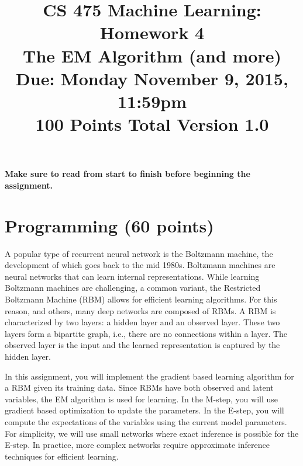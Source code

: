 \documentclass[11pt]{article}
\title{CS 475 Machine Learning: Homework 4\\The EM Algorithm (and more)\\
\Large{Due: Monday November 9, 2015, 11:59pm}\\
100 Points Total \hspace{1cm} Version 1.0}
\author{}
\date{}
\begin{document}
\large
\maketitle
\thispagestyle{headings}

\vspace{-.5in}

{\bf Make sure to read from start to finish before beginning the assignment.}


\section{Programming (60 points)}
A popular type of recurrent neural network is the Boltzmann machine, the development of which goes back to the mid 1980s. Boltzmann machines
are neural networks that can learn internal representations. While learning Boltzmann machines are challenging, a common variant, the Restricted Boltzmann
Machine (RBM) allows for efficient learning algorithms. For this reason, and others, many deep networks are composed of RBMs.
A RBM is characterized by two layers: a hidden layer and an observed layer. These two layers form a bipartite graph, i.e., there are no connections within a layer.
The observed layer is the input and the learned representation is captured by the hidden layer.

In this assignment, you will implement the gradient based learning algorithm for a RBM given its training data. Since RBMs have both observed and latent variables, the EM algorithm is used for learning. In the M-step, you will use gradient based optimization to update the parameters. In the E-step, you will compute the expectations of the variables using the current model parameters. For simplicity, we will use small networks where exact inference is possible for the E-step. In practice, more complex networks require approximate inference techniques for efficient learning.
\end{document}
